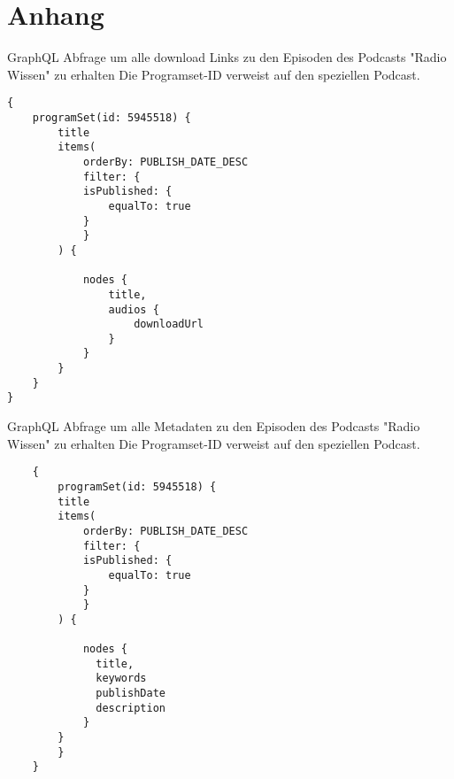 \chapter{Anhang}\label{app:supplemental-information}


\label{ch:graphql-1}
GraphQL Abfrage um alle download Links zu den Episoden des Podcasts "Radio Wissen" zu erhalten
Die Programset-ID verweist auf den speziellen Podcast.

\begin{verbatim}
{
    programSet(id: 5945518) {
        title
        items(
            orderBy: PUBLISH_DATE_DESC
            filter: {
            isPublished: {
                equalTo: true
            }
            }
        ) {
            
            nodes {
                title,
                audios {
                    downloadUrl
                }
            }
        }
    }
}

\end{verbatim}

\label{ch:graphql-2}
GraphQL Abfrage um alle Metadaten zu den Episoden des Podcasts "Radio Wissen" zu erhalten
Die Programset-ID verweist auf den speziellen Podcast.

\begin{verbatim}
    {
        programSet(id: 5945518) {
        title
        items(
            orderBy: PUBLISH_DATE_DESC
            filter: {
            isPublished: {
                equalTo: true
            }
            }
        ) {
          	
            nodes {
              title,
              keywords
              publishDate
              description
            }
        }
        }
    }

\end{verbatim}
